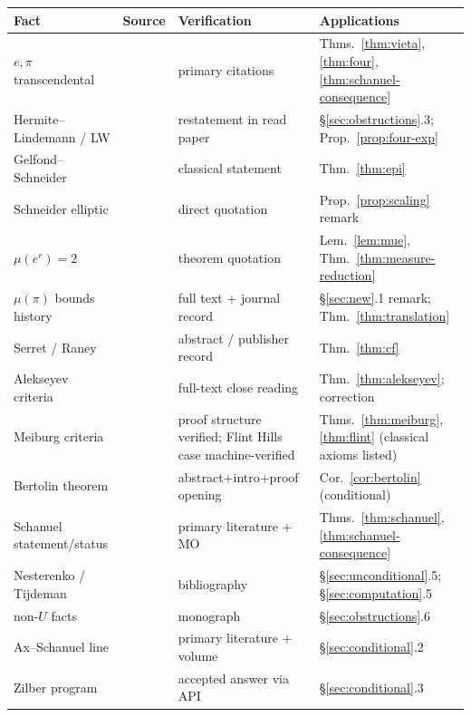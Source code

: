 \documentclass[11pt]{amsart}
\theoremstyle{definition}
\theoremstyle{remark}
\numberwithin{equation}{section}
\newcommand{\irr}{\mu}
\newcommand{\ee}{e}
\begin{document}
\begin{center}
\footnotesize\begin{tabularx}{\textwidth}{@{}p{}p{}p{}X@{}}
\toprule
Fact & Source & Verification & Applications \\
\midrule
$\ee,\pi$ transcendental & \cite{Hermite1873,Lindemann1882} & primary citations & Thms.~\ref{thm:vieta},\ref{thm:four},\ref{thm:schanuel-consequence} \\
Hermite--Lindemann / LW & \cite{Lindemann1882,Bertolin2026} & restatement in read paper & \S\ref{sec:obstructions}.3; Prop.~\ref{prop:four-exp} \\
Gelfond--Schneider & \cite{GS1934} & classical statement & Thm.~\ref{thm:epi} \\
Schneider elliptic & \cite{Duke} & direct quotation & Prop.~\ref{prop:scaling} remark \\
$\irr(\ee^r)=2$ & \cite{CNU2024} & theorem quotation & Lem.~\ref{lem:mue}, Thm.~\ref{thm:measure-reduction} \\
$\irr(\pi)$ bounds history & \cite{Alekseyev2011,ZZ2020} & full text + journal record & \S\ref{sec:new}.1 remark; Thm.~\ref{thm:translation} \\
Serret / Raney & \cite{Panti2017,Raney1973} & abstract / publisher record & Thm.~\ref{thm:cf} \\
Alekseyev criteria & \cite{Alekseyev2011} & full-text close reading & Thm.~\ref{thm:alekseyev}; correction \\
Meiburg criteria & \cite{Meiburg2022} & proof structure verified; Flint Hills case machine-verified & Thms.~\ref{thm:meiburg},\ref{thm:flint} (classical axioms listed) \\
Bertolin theorem & \cite{Bertolin2026} & abstract+intro+proof opening & Cor.~\ref{cor:bertolin} (conditional) \\
Schanuel statement/status & \cite{Ax1971,Baker,MO33817} & primary literature + MO & Thms.~\ref{thm:schanuel},\ref{thm:schanuel-consequence} \\
Nesterenko / Tijdeman & \cite{Nesterenko1996,Tijdemann1971} & bibliography & \S\ref{sec:unconditional}.5; \S\ref{sec:computation}.5 \\
non-$U$ facts & \cite{Baker} & monograph & \S\ref{sec:obstructions}.6 \\
Ax--Schanuel line & \cite{Ax1971,MPT2019,BakkerTsimerman2019,CambridgeFF} & primary literature + volume & \S\ref{sec:conditional}.2 \\
Zilber program & \cite{MO33817} & accepted answer via API & \S\ref{sec:conditional}.3 \\

\end{tabularx}
\end{center}
\end{document}
